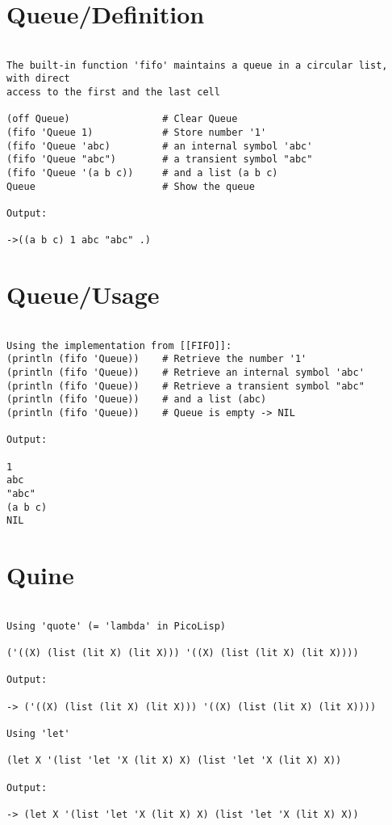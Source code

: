 \section*{Queue/Definition}

\begin{verbatim}

The built-in function 'fifo' maintains a queue in a circular list, with direct
access to the first and the last cell

(off Queue)                # Clear Queue
(fifo 'Queue 1)            # Store number '1'
(fifo 'Queue 'abc)         # an internal symbol 'abc'
(fifo 'Queue "abc")        # a transient symbol "abc"
(fifo 'Queue '(a b c))     # and a list (a b c)
Queue                      # Show the queue

Output:

->((a b c) 1 abc "abc" .)

\end{verbatim}

\section*{Queue/Usage}

\begin{verbatim}

Using the implementation from [[FIFO]]:
(println (fifo 'Queue))    # Retrieve the number '1'
(println (fifo 'Queue))    # Retrieve an internal symbol 'abc'
(println (fifo 'Queue))    # Retrieve a transient symbol "abc"
(println (fifo 'Queue))    # and a list (abc)
(println (fifo 'Queue))    # Queue is empty -> NIL

Output:

1
abc
"abc"
(a b c)
NIL

\end{verbatim}

\section*{Quine}

\begin{verbatim}

Using 'quote' (= 'lambda' in PicoLisp)

('((X) (list (lit X) (lit X))) '((X) (list (lit X) (lit X))))

Output:

-> ('((X) (list (lit X) (lit X))) '((X) (list (lit X) (lit X))))

Using 'let'

(let X '(list 'let 'X (lit X) X) (list 'let 'X (lit X) X))

Output:

-> (let X '(list 'let 'X (lit X) X) (list 'let 'X (lit X) X))

\end{verbatim}

